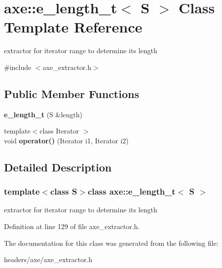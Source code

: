 \hypertarget{classaxe_1_1e__length__t}{\section{axe\+:\+:e\+\_\+length\+\_\+t$<$ S $>$ Class Template Reference}
\label{classaxe_1_1e__length__t}
}


extractor for iterator range to determine its length  




{\ttfamily \#include $<$axe\+\_\+extractor.\+h$>$}

\subsection*{Public Member Functions}
\begin{DoxyCompactItemize}
\item 
\hypertarget{classaxe_1_1e__length__t_a4512578dd8f36727dadc5e84c8ed67b1}{{\bfseries e\+\_\+length\+\_\+t} (S \&length)}\label{classaxe_1_1e__length__t_a4512578dd8f36727dadc5e84c8ed67b1}

\item 
\hypertarget{classaxe_1_1e__length__t_a08bd249ee761e2156d5d4c9fd5845187}{{\footnotesize template$<$class Iterator $>$ }\\void {\bfseries operator()} (Iterator i1, Iterator i2)}\label{classaxe_1_1e__length__t_a08bd249ee761e2156d5d4c9fd5845187}

\end{DoxyCompactItemize}


\subsection{Detailed Description}
\subsubsection*{template$<$class S$>$class axe\+::e\+\_\+length\+\_\+t$<$ S $>$}

extractor for iterator range to determine its length 

Definition at line 129 of file axe\+\_\+extractor.\+h.



The documentation for this class was generated from the following file\+:\begin{DoxyCompactItemize}
\item 
headers/axe/axe\+\_\+extractor.\+h\end{DoxyCompactItemize}
